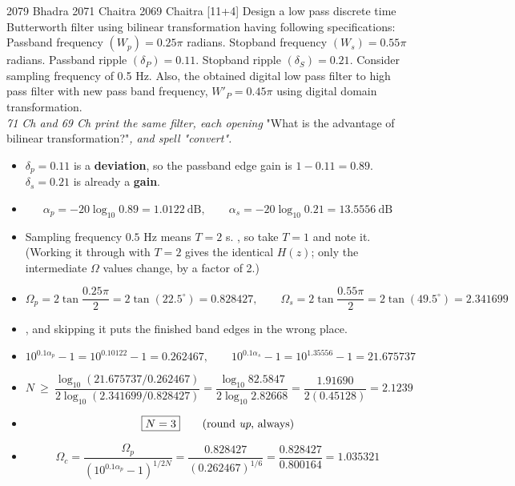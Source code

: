 \begin{asked}{2079 Bhadra \textperiodcentered{} 2071 Chaitra \textperiodcentered{} 2069 Chaitra \textperiodcentered{} [11+4]}
Design a low pass discrete time Butterworth filter using bilinear transformation having
following specifications: Passband frequency $(W_p)=0.25\pi$ radians. Stopband frequency
$(W_s)=0.55\pi$ radians. Passband ripple $(\delta_P)=0.11$. Stopband ripple
$(\delta_S)=0.21$. Consider sampling frequency of 0.5 Hz. Also,  the obtained
digital low pass filter to high pass filter with new pass band frequency,
$W'_P=0.45\pi$ using digital domain transformation.\\
\textit{71 Ch and 69 Ch print the same filter, each opening} "What is the advantage of
bilinear transformation?"\textit{, and spell "convert".}
\end{asked}

\begin{itemize}
  \item $\delta_p=0.11$ is a \textbf{deviation}, so the passband edge gain is
        $1-0.11=0.89$. $\delta_s=0.21$ is already a \textbf{gain}.
  \item[] \[ \alpha_p=-20\log_{10}0.89=\mathbf{1.0122}\ \text{dB},\qquad
             \alpha_s=-20\log_{10}0.21=\mathbf{13.5556}\ \text{dB} \]
  \item Sampling frequency $0.5$ Hz means $T=2$ s. , so take $T=1$
        and note it. (Working it through with $T=2$ gives the identical $H(z)$; only the
        intermediate $\Omega$ values change, by a factor of 2.)
\end{itemize}

\begin{itemize}
  \item[] \[ \Omega_p=2\tan\frac{0.25\pi}{2}=2\tan(22.5^\circ)=\mathbf{0.828427},\qquad
             \Omega_s=2\tan\frac{0.55\pi}{2}=2\tan(49.5^\circ)=\mathbf{2.341699} \]
  \item {}, and skipping it puts the finished band
        edges in the wrong place.
\end{itemize}

\begin{itemize}
  \item[] \[ 10^{0.1\alpha_p}-1=10^{0.10122}-1=0.262467,\qquad
             10^{0.1\alpha_s}-1=10^{1.35556}-1=21.675737 \]
  \item[] \[ N\ \ge\ \frac{\log_{10}(21.675737/0.262467)}{2\log_{10}(2.341699/0.828427)}
             =\frac{\log_{10}82.5847}{2\log_{10}2.82668}
             =\frac{1.91690}{2(0.45128)}=2.1239 \]
  \item[] \[ \boxed{N=3} \qquad\text{(round \emph{up}, always)} \]
  \item[] \[ \Omega_c=\frac{\Omega_p}{(10^{0.1\alpha_p}-1)^{1/2N}}
             =\frac{0.828427}{(0.262467)^{1/6}}=\frac{0.828427}{0.800164}
             =\mathbf{1.035321} \]
\end{itemize}

